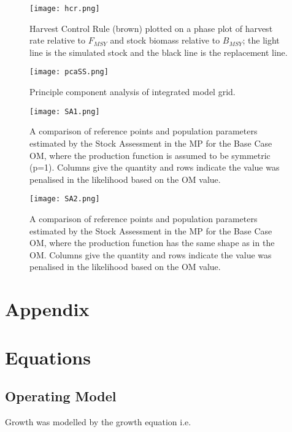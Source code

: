 \documentclass[%
nonumbib,      %
%
]{nrc1}                          %
\begin{document}
\begin{figure*}[htbp]
\centering
\texttt{[image: hcr.png]}
\label{fig:hcr}
\caption{Harvest Control Rule (brown) plotted on a phase plot of harvest rate relative to $F_{MSY}$ and stock biomass relative to $B_{MSY}$;
the light line is the simulated stock and the black line is the replacement line.}
\end{figure*}


\begin{figure*}[htbp]
\centering
\texttt{[image: pcaSS.png]}
\label{fig:pcaSS}
\caption{Principle component analysis of integrated model grid.}
\end{figure*}


\begin{figure*}[htbp]
\centering
\texttt{[image: SA1.png]}
\caption{A comparison of reference points and population parameters estimated by the Stock Assessment in the MP for the Base Case OM, where the production function is assumed to be symmetric (p=1). Columns give the quantity and rows indicate the value was penalised in the likelihood based on the OM value.}
\label{fig:sa1}
\end{figure*}

\begin{figure*}[htbp]
\centering
\texttt{[image: SA2.png]}
\caption{A comparison of reference points and population parameters estimated by the Stock Assessment in the MP for the Base Case OM, where the production function has the same shape as in the OM. Columns give the quantity and rows indicate the value was penalised in the likelihood based on the OM value.}
\label{fig:sa2}
\end{figure*}


\newpage\clearpage
\section{Appendix}

\newpage\clearpage
\section*{Equations}

\subsection*{Operating Model}

Growth was modelled by the \cite{vonbert1957quantitative} growth equation i.e.
 
\end{document}
